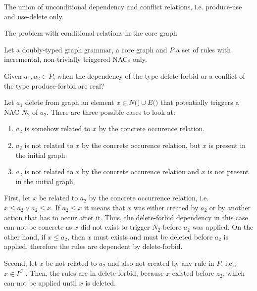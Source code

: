 \begin{definition} The union of unconditional dependency and conflict relations, i.e. produce-use and use-delete only.
\end{definition}

The problem with conditional relations in the core graph

\begin{definition} Let \doublyTypedGraphGrammarCore{} a doubly-typed graph grammar, \coreGraph{} a core graph and $P$ a set of rules with incremental, non-trivially triggered NACs only.

Given $a_1, a_2 \in P$, when the dependency of the type delete-forbid or a conflict of the type produce-forbid are real?

Let $a_1$ delete from graph \coreGraph{} an element $x \in N($\coreGraph$) \cup E($\coreGraph$)$ that potentially triggers a NAC $N_2$ of $a_2$. There are three possible cases to look at:

\begin{enumerate}
  \item $a_2$ is somehow related to $x$ by the concrete occurence relation.
  \item $a_2$ is not related to $x$ by the concrete occurence relation, but $x$ is present in the initial graph.
  \item $a_2$ is not related to $x$ by the concrete occurence relation and $x$ is not present in the initial graph.
\end{enumerate}

First, let $x$ be related to $a_2$ by the concrete occurrence relation, i.e. \mbox{$x \leq a_2 \lor a_2 \leq x$}. If $a_2 \leq x$ it means that $x$ was either created by $a_2$ or by another action that has to occur after it. Thus, the delete-forbid dependency in this case can not be concrete as $x$ did not exist to trigger $N_2$ before $a_2$ was applied. On the other hand, if $x \leq a_2$, then $x$ must exists and must be deleted before $a_2$ is applied, therefore the rules are dependent by delete-forbid.

  Second, let $x$ be not related to $a_2$ and also not created by any rule in $P$, i.e., $x \in I^{C^T}$. Then, the rules are in delete-forbid, because $x$ existed before $a_2$, which can not be applied until $x$ is deleted.


\end{definition}
